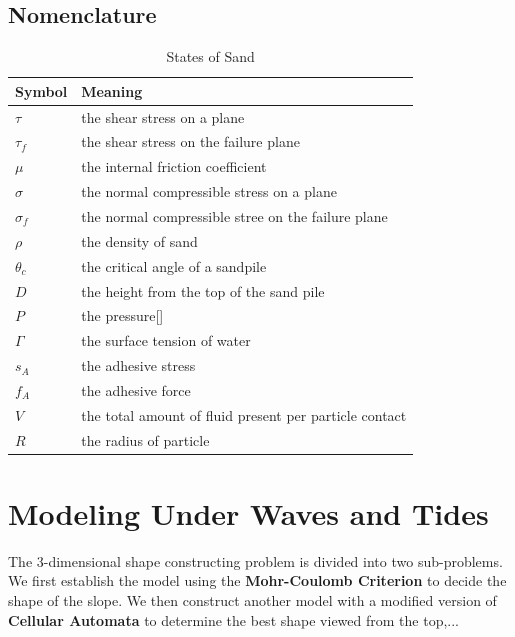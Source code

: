 \documentclass[12pt]{article}
\begin{document}
\subsection{Nomenclature}
\begin{table}[H]
    \caption{States of Sand}
    \vspace{5pt}
    \centering
    \begin{tabular}{p{3cm}p{12cm}}
        \hline
        Symbol     & Meaning                                                \\
        \hline
        $\tau$     & the shear stress on a plane                            \\
        $\tau_f$   & the shear stress on the failure plane                  \\
        $\mu$      & the internal friction coefficient                      \\
        $\sigma$   & the normal compressible stress on a plane              \\
        $\sigma_f$ & the normal compressible stree on the failure plane     \\
        $\rho$     & the density of sand                                    \\
        $\theta_c$ & the critical angle of a sandpile                       \\
        $D$        & the height from the top of the sand pile               \\
        $P$        & the pressure[]                                         \\
        $\Gamma$   & the surface tension of water                           \\
        $s_A$      & the adhesive stress                                    \\
        $f_A$      & the adhesive force                                     \\
        $V$        & the total amount of fluid present per particle contact \\
        $R$        & the radius of particle                                 \\
        \hline
    \end{tabular}
    \label{bs2}
\end{table}

\section{Modeling Under Waves and Tides}
\par
The 3-dimensional shape constructing problem is divided into two sub-problems. We first establish the model using the \textbf{Mohr-Coulomb Criterion} to decide the shape of the slope. We then construct another model with a modified version of \textbf{Cellular Automata} to determine the best shape viewed from the top,...
\end{document}
